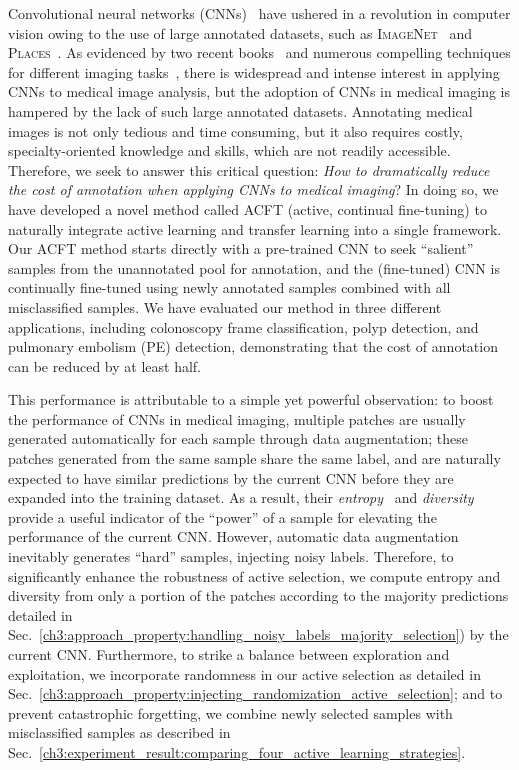 Convolutional neural networks (CNNs)~\citep{lecun2015deep} have ushered in a revolution in computer vision owing to the use of large annotated datasets, such as \textsc{ImageNet}~\citep{deng2009imagenet} and \textsc{Places}~\citep{zhou2017places}. As evidenced by two recent books~\citep{shen2019medical,zhou2019handbook} and numerous compelling techniques for different imaging tasks~\citep{moen2019deep,yamamoto2019automated,ravizza2019predicting,esteva2019guide,huang2020penet,isensee2021nnu}, there is widespread and intense interest in applying CNNs to medical image analysis, but the adoption of CNNs in medical imaging is hampered by the lack of such large annotated datasets. Annotating medical images is not only tedious and time consuming, but it also requires costly, specialty-oriented knowledge and skills, which are not readily accessible. Therefore, we seek to answer this critical question: {\em How to dramatically reduce the cost of annotation when applying CNNs to medical imaging}?
In doing so, we have developed a novel method called ACFT (active, continual fine-tuning) to naturally integrate active learning and transfer learning into a single framework. Our ACFT method starts directly with a pre-trained CNN to seek ``salient'' samples from the unannotated pool for annotation, and the (fine-tuned) CNN is continually fine-tuned using newly annotated samples combined with all misclassified samples. We have evaluated our method in three different applications, including colonoscopy frame classification, polyp detection, and pulmonary embolism (PE) detection, demonstrating that the cost of annotation can be reduced by at least half.

This performance is attributable to a simple yet powerful observation: to boost the performance of CNNs in medical imaging, multiple patches are usually generated automatically for each sample through data augmentation; these patches generated from the same sample share the same label, and are naturally expected to have similar predictions by the current CNN before they are expanded into the training dataset. As a result, their {\em entropy}~\citep{shannon1948mathematical} and {\em diversity}~\citep{kukar2003transductive} provide a useful indicator of the ``power'' of a sample for elevating the performance of the current CNN. However, automatic data augmentation inevitably generates ``hard'' samples, injecting noisy labels. Therefore, to significantly enhance the robustness of active selection, we compute entropy and diversity from only a portion of the patches according to the majority predictions detailed in Sec.~\ref{ch3:approach_property:handling_noisy_labels_majority_selection}) by the current CNN. 
Furthermore, to strike a balance between exploration and exploitation, we incorporate randomness in our active selection as detailed in Sec.~\ref{ch3:approach_property:injecting_randomization_active_selection}; and to prevent catastrophic forgetting, we combine newly selected samples with misclassified samples as described in Sec.~\ref{ch3:experiment_result:comparing_four_active_learning_strategies}.

